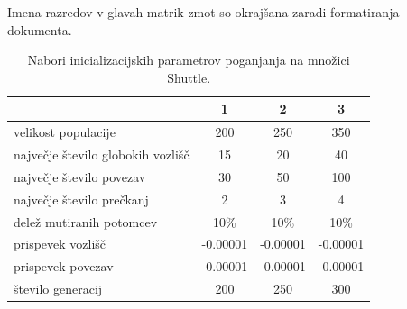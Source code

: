 Imena razredov v glavah matrik zmot so okrajšana zaradi formatiranja dokumenta.
\begin{table}[H]
    \caption{Nabori inicializacijskih parametrov poganjanja na množici Shuttle.}
    \begin{center}
        \begin{tabular}{||l c c c||}
            \hline
            & 1        & 2        & 3 \\ [0.5ex]
            \hline
            velikost populacije               & 200      & 250      & 350      \\
            \hline
            največje število globokih vozlišč & 15       & 20       & 40       \\
            \hline
            največje število povezav          & 30       & 50       & 100      \\
            \hline
            največje število prečkanj         & 2        & 3        & 4        \\
            \hline
            delež mutiranih potomcev          & 10\%     & 10\%     & 10\%     \\
            \hline
            prispevek vozlišč                 & -0.00001 & -0.00001 & -0.00001 \\
            \hline
            prispevek povezav                 & -0.00001 & -0.00001 & -0.00001 \\
            \hline
            število generacij                 & 200      & 250      & 300      \\
            \hline
        \end{tabular}
    \end{center}
    \label{tab:param_statlog}
\end{table}

